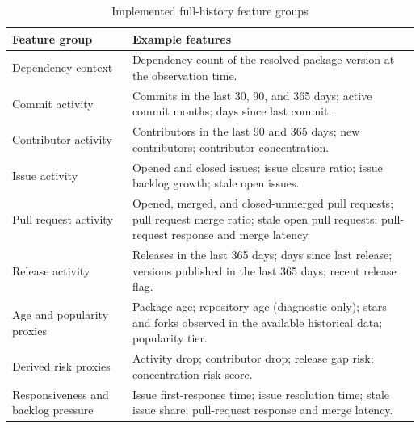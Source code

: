 \begin{table}[htbp]
\centering
\caption{Implemented full-history feature groups}
\label{tab:method-feature-groups}
\begin{tabular}{p{} p{}}
\hline
\textbf{Feature group} & \textbf{Example features} \\
\hline
Dependency context &
Dependency count of the resolved package version at the observation time. \\
Commit activity &
Commits in the last 30, 90, and 365 days; active commit months; days since last commit. \\
Contributor activity &
Contributors in the last 90 and 365 days; new contributors; contributor concentration. \\
Issue activity &
Opened and closed issues; issue closure ratio; issue backlog growth; stale open issues. \\
Pull request activity &
Opened, merged, and closed-unmerged pull requests; pull request merge ratio; stale open pull requests; pull-request response and merge latency. \\
Release activity &
Releases in the last 365 days; days since last release; versions published in the last 365 days; recent release flag. \\
Age and popularity proxies &
Package age; repository age (diagnostic only); stars and forks observed in the available historical data; popularity tier. \\
Derived risk proxies &
Activity drop; contributor drop; release gap risk; concentration risk score. \\
Responsiveness and backlog pressure &
Issue first-response time; issue resolution time; stale issue share; pull-request response and merge latency. \\
\hline
\end{tabular}
\end{table}

